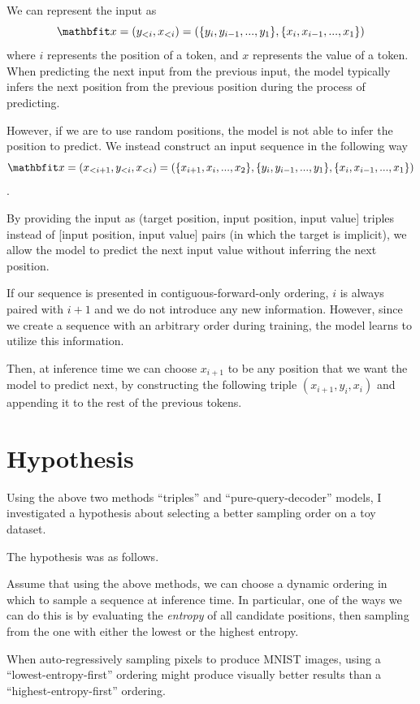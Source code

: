 We can represent the input as
$$
   \x = (y_{<i}, x_{<i}) = ( \{ y_i, y_{i-1}, ..., y_1 \}, \{ x_i, x_{i-1}, ..., x_1 \} )
$$
where $i$ represents the position of a token, and $x$ represents the value of a token. When predicting the next input from the previous input, the model typically infers the next position from the previous position during the process of predicting.

However, if we are to use random positions, the model is not able to infer the position to predict. We instead construct an input sequence in the following way
$$
   \x = (x_{<i+1}, y_{<i}, x_{<i}) = ( \{ x_{i+1}, x_{i}, ..., x_2 \}, \{ y_i, y_{i-1}, ..., y_1 \}, \{ x_i, x_{i-1}, ..., x_1 \} )
$$.

By providing the input as (target position, input position, input value] triples instead of [input position, input value] pairs (in which the target is implicit), we allow the model to predict the next input value without inferring the next position.

If our sequence is presented in contiguous-forward-only ordering, $i$ is always paired with $i+1$ and we do not introduce any new information. However, since we create a sequence with an arbitrary order during training, the model learns to utilize this information.

Then, at inference time we can choose $x_{i+1}$ to be any position that we want the model to predict next, by constructing the following triple $(x_{i+1}, y_i, x_i)$ and appending it to the rest of the previous tokens.


\section{Hypothesis}
\label{s:a-o-hypotheses}

Using the above two methods ``triples'' and ``pure-query-decoder'' models, I investigated a hypothesis about selecting a better sampling order on a toy dataset.

The hypothesis was as follows.

Assume that using the above methods, we can choose a dynamic ordering in which to sample a sequence at inference time. In particular, one of the ways we can do this is by evaluating the \textit{entropy} of all candidate positions, then sampling from the one with either the lowest or the highest entropy.

When auto-regressively sampling pixels to produce MNIST images, using a ``lowest-entropy-first'' ordering might produce visually better results than a ``highest-entropy-first'' ordering.

